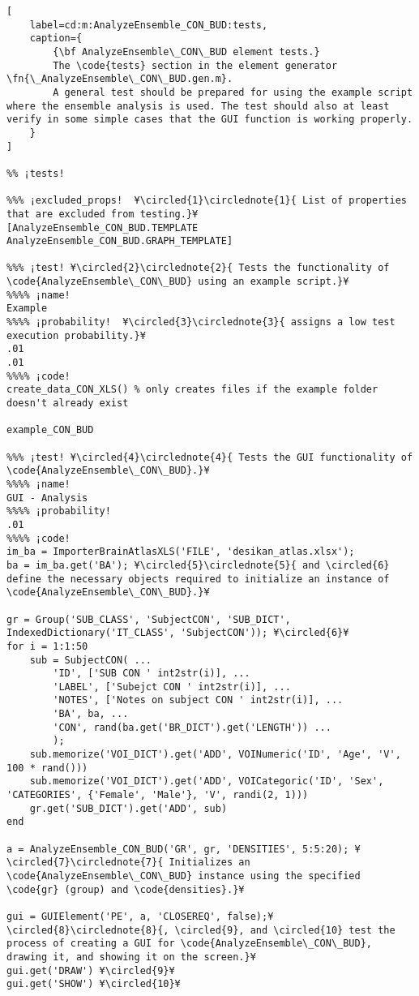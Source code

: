 \documentclass{tufte-handout}
\begin{document}
\begin{lstlisting}[
	label=cd:m:AnalyzeEnsemble_CON_BUD:tests,
	caption={
		{\bf AnalyzeEnsemble\_CON\_BUD element tests.}
		The \code{tests} section in the element generator \fn{\_AnalyzeEnsemble\_CON\_BUD.gen.m}.
		A general test should be prepared for using the example script where the ensemble analysis is used. The test should also at least verify in some simple cases that the GUI function is working properly.
	}
]	

%% ¡tests!

%%% ¡excluded_props!  ¥\circled{1}\circlednote{1}{ List of properties that are excluded from testing.}¥
[AnalyzeEnsemble_CON_BUD.TEMPLATE AnalyzeEnsemble_CON_BUD.GRAPH_TEMPLATE]

%%% ¡test! ¥\circled{2}\circlednote{2}{ Tests the functionality of \code{AnalyzeEnsemble\_CON\_BUD} using an example script.}¥
%%%% ¡name!
Example
%%%% ¡probability!  ¥\circled{3}\circlednote{3}{ assigns a low test execution probability.}¥
.01
.01
%%%% ¡code!
create_data_CON_XLS() % only creates files if the example folder doesn't already exist

example_CON_BUD

%%% ¡test! ¥\circled{4}\circlednote{4}{ Tests the GUI functionality of \code{AnalyzeEnsemble\_CON\_BUD}.}¥
%%%% ¡name!
GUI - Analysis
%%%% ¡probability!
.01
%%%% ¡code!
im_ba = ImporterBrainAtlasXLS('FILE', 'desikan_atlas.xlsx');
ba = im_ba.get('BA'); ¥\circled{5}\circlednote{5}{ and \circled{6} define the necessary objects required to initialize an instance of \code{AnalyzeEnsemble\_CON\_BUD}.}¥

gr = Group('SUB_CLASS', 'SubjectCON', 'SUB_DICT', IndexedDictionary('IT_CLASS', 'SubjectCON')); ¥\circled{6}¥
for i = 1:1:50 
    sub = SubjectCON( ...
        'ID', ['SUB CON ' int2str(i)], ...
        'LABEL', ['Subejct CON ' int2str(i)], ...
        'NOTES', ['Notes on subject CON ' int2str(i)], ...
        'BA', ba, ...
        'CON', rand(ba.get('BR_DICT').get('LENGTH')) ...
        );
    sub.memorize('VOI_DICT').get('ADD', VOINumeric('ID', 'Age', 'V', 100 * rand()))
    sub.memorize('VOI_DICT').get('ADD', VOICategoric('ID', 'Sex', 'CATEGORIES', {'Female', 'Male'}, 'V', randi(2, 1)))
    gr.get('SUB_DICT').get('ADD', sub)
end

a = AnalyzeEnsemble_CON_BUD('GR', gr, 'DENSITIES', 5:5:20); ¥\circled{7}\circlednote{7}{ Initializes an \code{AnalyzeEnsemble\_CON\_BUD} instance using the specified \code{gr} (group) and \code{densities}.}¥

gui = GUIElement('PE', a, 'CLOSEREQ', false);¥\circled{8}\circlednote{8}{, \circled{9}, and \circled{10} test the process of creating a GUI for \code{AnalyzeEnsemble\_CON\_BUD}, drawing it, and showing it on the screen.}¥
gui.get('DRAW') ¥\circled{9}¥
gui.get('SHOW') ¥\circled{10}¥


\end{lstlisting}
\end{document}
